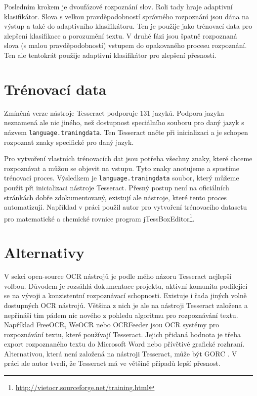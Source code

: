 \documentclass[thesis=B,czech]{FITthesis}[2019/12/23]
\begin{document}
Posledním krokem je dvoufázové rozpoznání slov. Roli tady hraje adaptivní klasifikátor. Slova s velkou pravděpodobností správného rozpoznání jsou dána na výstup a také do adaptivního klasifikátoru. Ten je použije jako \mbox{trénovací} data pro zlepšení klasifikace a porozumění textu. V druhé fázi jsou špatně rozpoznaná slova (s malou pravděpodobností) vstupem do opakovaného procesu rozpoznání. Ten ale tentokrát použije adaptivní klasifikátor pro zlepšení přesnosti.


\section{Trénovací data}
Zmíněná verze nástroje Tesseract \cite{smithTesseract2005} podporuje 131 jazyků. Podpora jazyka neznamená ale nic jiného, než dostupnost speciálního souboru pro daný jazyk s názvem \texttt{language.traningdata}. Ten Tesseract načte při inicializaci a je schopen rozpoznat znaky specifické pro daný jazyk.

Pro vytvoření vlastních trénovacích dat jsou potřeba všechny znaky, které chceme rozpoznávat a můžou se objevit na vstupu. Tyto znaky anotujeme a spustíme trénovací proces. Výsledkem je \texttt{language.traningdata} soubor, který můžeme použít při inicializaci nástroje Tesseract. Přesný postup není na oficiálních stránkách dobře zdokumentovaný, existují ale nástroje, které tento proces automatizují. Například v práci \cite{Filip2019} použil autor pro vytvoření trénovacího datasetu pro matematické a chemické rovnice program jTessBoxEditor\footnote{\url{http://vietocr.sourceforge.net/training.html}}.

\newpage
\section{Alternativy}
V sekci open-source OCR nástrojů je podle mého názoru Tesseract nejlepší volbou. Důvodem je rozsáhlá dokumentace projektu, aktivní komunita podílející se na vývoji a konzistentní rozpoznávací schopnosti. Existuje i řada jiných volně dostupných OCR nástrojů. Většina z nich je ale na nástroji Tesseract založena a nepřináší tím pádem nic nového z pohledu algoritmu pro rozpoznávání textu. Například FreeOCR, WeOCR nebo OCRFeeder jsou OCR systémy pro rozpoznávání textu, které používají Tesseract. Jejich přidaná hodnota je třeba export rozpoznaného textu do Microsoft Word nebo přívětivé grafické rozhraní. Alternativou, která není založená na nástroji Tesseract, může být GORC \cite{schulenburgGOCR2000}. V práci  \cite{dhimanTesseractVsGocr2013a} ale autor tvrdí, že Tesseract má ve většině případů lepší přesnost.
\end{document}
